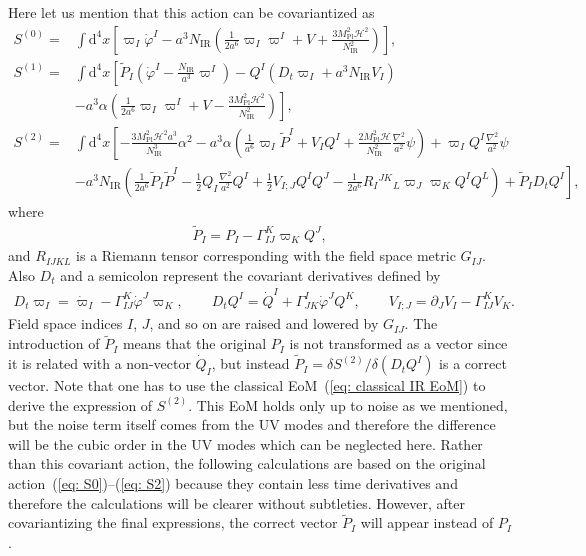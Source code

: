 \documentclass[a4paper,11pt]{article}
\newcommand{\dd}{\mathrm{d}}
\newcommand{\Mpl}{M_\text{Pl}}
\newcommand{\IR}{\text{IR}}
\newcommand{\calH}{\mathcal{H}}
\newcommand{\bae}[1]{\begin{align} #1 \end{align}}
\begin{document}
Here let us mention that this action can be covariantized as
\bae{
	S^{(0)}=&\int\dd^4x\left[\varpi_I\dot{\varphi}^I-a^3N_\IR\left(\frac{1}{2a^6}\varpi_I\varpi^I+V+\frac{3\Mpl^2\calH^2}{N_\IR^2}\right)\right], \\
	S^{(1)}=&\int\dd^4x\left[\tilde{P}_I\left(\dot{\varphi}^I-\frac{N_\IR}{a^3}\varpi^I\right)-Q^I\left(D_t\varpi_I+a^3N_\IR V_I\right) \right. \nonumber \\
	&\left.-a^3\alpha\left(\frac{1}{2a^6}\varpi_I\varpi^I+V-\frac{3\Mpl^2\calH^2}{N_\IR^2}\right)\right], \\
	S^{(2)}=&\int\dd^4x\left[-\frac{3\Mpl^2\calH^2a^3}{N_\IR^3}\alpha^2-a^3\alpha\left(\frac{1}{a^6}\varpi_I\tilde{P}^I+V_IQ^I
	+\frac{2\Mpl^2\calH}{N_\IR^2}\frac{\nabla^2}{a^2}\psi\right)+\varpi_IQ^I\frac{\nabla^2}{a^2}\psi \right. \nonumber \\
	&\left.-a^3N_\IR\left(\frac{1}{2a^6}\tilde{P}_I\tilde{P}^I-\frac{1}{2}Q_I\frac{\nabla^2}{a^2}Q^I+\frac{1}{2}V_{I;J}Q^IQ^J-
	\frac{1}{2a^6}R_I{}^{JK}{}_L\varpi_J\varpi_KQ^IQ^L\right)
	+\tilde{P}_ID_tQ^I\right], \label{eq: S2 cov}
}
where
\bae{
	\tilde{P}_I=P_I-\Gamma^K_{IJ}\varpi_KQ^J,
}
and $R_{IJKL}$ is a Riemann tensor corresponding with the field space metric $G_{IJ}$.
Also $D_t$ and a semicolon represent the covariant derivatives defined by
\bae{
	D_t\varpi_I=\dot{\varpi}_I-\Gamma^K_{IJ}\dot{\varphi}^J\varpi_K, \quad\quad D_tQ^I=\dot{Q}^I+\Gamma^I_{JK}\dot{\varphi}^JQ^K,
	\quad\quad V_{I;J}=\partial_JV_I-\Gamma^K_{IJ}V_K.
}
Field space indices $I$, $J$, and so on are raised and lowered by $G_{IJ}$.
The introduction of $\tilde{P}_I$ means that the original $P_I$ is not transformed as a vector since it is related with a non-vector $\dot{Q}_I$, 
but instead $\tilde{P}_I=\delta S^{(2)}/\delta (D_tQ^I)$ is a correct vector. 
Note that one has to use the classical EoM~(\ref{eq: classical IR EoM}) to derive the expression
of $S^{(2)}$. This EoM holds only up to noise as we mentioned, 
but the noise term itself comes from the UV modes and therefore the difference will be the cubic order
in the UV modes which can be neglected here.
Rather than this covariant action, the following calculations are based on the original action~(\ref{eq: S0})--(\ref{eq: S2}) because they contain less time derivatives and therefore the calculations will be clearer without subtleties.
However, after covariantizing the final expressions, the correct vector $\tilde{P}_I$ will appear instead of $P_I$.
\end{document}
